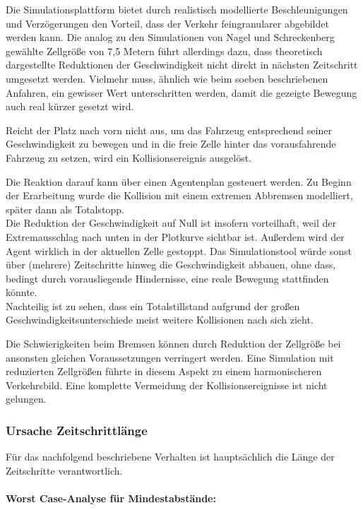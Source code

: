 Die Simulationsplattform bietet durch realistisch modellierte Beschleunigungen und Verzögerungen den Vorteil, dass der Verkehr feingranularer abgebildet werden kann.
Die analog zu den Simulationen von Nagel und Schreckenberg gewählte Zellgröße von 7,5 Metern führt allerdings dazu, dass theoretisch dargestellte Reduktionen der Geschwindigkeit nicht direkt in nächsten Zeitschritt umgesetzt werden.
Vielmehr muss, ähnlich wie beim soeben beschriebenen Anfahren, ein gewisser Wert unterschritten werden, damit die gezeigte Bewegung auch real kürzer gesetzt wird.

Reicht der Platz nach vorn nicht aus, um das Fahrzeug entsprechend seiner Geschwindigkeit zu bewegen und in die freie Zelle hinter das vorausfahrende Fahrzeug zu setzen, wird ein Kollisionsereignis ausgelöst.

Die Reaktion darauf kann über einen Agentenplan gesteuert werden.
Zu Beginn der Erarbeitung wurde die Kollision mit einem extremen Abbremsen modelliert, später dann als Totalstopp.
\\
Die Reduktion der Geschwindigkeit auf Null ist insofern vorteilhaft, weil der Extremausschlag nach unten in der Plotkurve sichtbar ist.
Außerdem wird der Agent wirklich in der aktuellen Zelle gestoppt. 
Das Simulationstool würde sonst über (mehrere) Zeitschritte hinweg die Geschwindigkeit abbauen, ohne dass, bedingt durch vorausliegende Hindernisse, eine reale Bewegung stattfinden könnte. 
\\
Nachteilig ist zu sehen, dass ein Totalstillstand aufgrund der großen Geschwindigkeitsunterschiede meist weitere Kollisionen nach sich zieht.

Die Schwierigkeiten beim Bremsen können durch Reduktion der Zellgröße bei ansonsten gleichen Voraussetzungen verringert werden.
Eine Simulation mit reduzierten Zellgrößen führte in diesem Aspekt zu einem harmonischeren Verkehrsbild.
Eine komplette Vermeidung der Kollisionsereignisse ist nicht gelungen.


\subsubsection{Ursache Zeitschrittlänge}

Für das nachfolgend beschriebene Verhalten ist hauptsächlich die Länge der Zeitschritte verantwortlich.

\paragraph*{Worst Case-Analyse für Mindestabstände:}
\label{sec:mindestabstaende}

